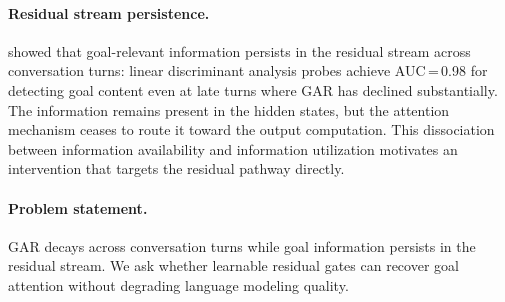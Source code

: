 \paragraph{Residual stream persistence.}
\citet{dongre2026attention} showed that goal-relevant information persists in the residual stream across conversation turns: linear discriminant analysis probes achieve AUC\,=\,0.98 for detecting goal content even at late turns where GAR has declined substantially. The information remains present in the hidden states, but the attention mechanism ceases to route it toward the output computation. This dissociation between information availability and information utilization motivates an intervention that targets the residual pathway directly.

\paragraph{Problem statement.}
GAR decays across conversation turns while goal information persists in the residual stream. We ask whether learnable residual gates can recover goal attention without degrading language modeling quality.